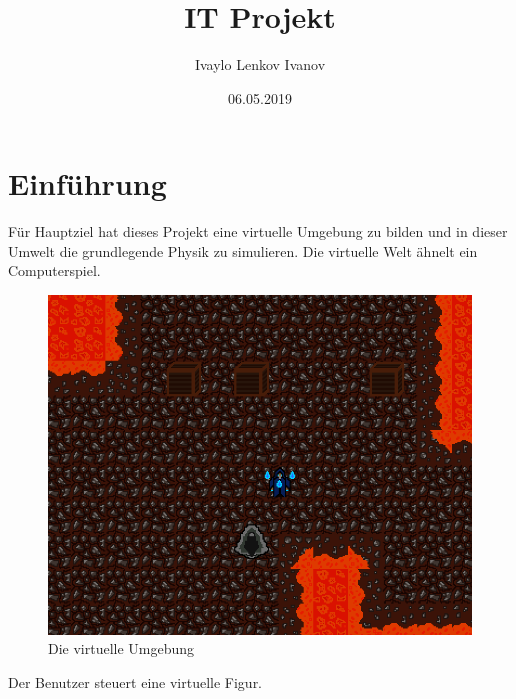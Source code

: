 \documentclass {article}
\title{IT Projekt}
\date{06.05.2019}
\author{Ivaylo Lenkov Ivanov}
\begin{document}
\begin{titlepage}
  \maketitle
  \tableofcontents
  \pagebreak
  \listoffigures
\end{titlepage}

\justify
\section{Einführung}
Für Hauptziel hat dieses Projekt eine virtuelle Umgebung zu bilden und in dieser Umwelt die grundlegende Physik zu simulieren. Die virtuelle Welt ähnelt ein Computerspiel.

\begin{figure}[h]
  \centering
  \includegraphics[scale=0.25]{VirtualEnvironment}
  \caption{Die virtuelle Umgebung}
  \label{fig:Umgebung}
\end{figure}

\justify
Der Benutzer steuert eine virtuelle Figur.
\end{document}
